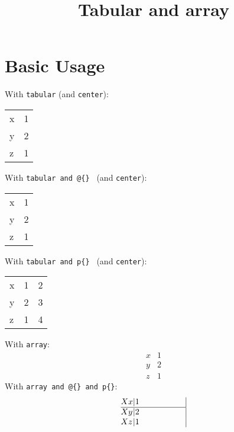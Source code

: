 \documentclass{ximera}
\title{Tabular and array}
\begin{document}
\begin{abstract}
\end{abstract}
\maketitle

\section{Basic Usage}


        With \verb|tabular| (and \verb|center|):
        \begin{center}
            \begin{tabular}{lr}
                x & 1 \\
                y & 2 \\
                z & 1
            \end{tabular}
        \end{center}
        
        With \verb|tabular and @{} | (and \verb|center|):
        \begin{center}
            \begin{tabular}{@{}l@{ }r@{.}}
             x & 1 \\
             y & 2 \\
             z & 1
            \end{tabular}
            \end{center}

    With \verb|tabular and p{} | (and \verb|center|):
        \begin{center}
            \begin{tabular}{|p{1cm}|p{2cm}|p{3cm}|}
             x & 1 & 2\\
             y & 2 & 3\\
             z & 1 & 4
            \end{tabular}
        \end{center}

    With \verb|array|:
        $$
        \begin{array}{l|r}
         x & 1 \\
         \hline
         y & 2 \\
         z & 1
        \end{array}
        $$
    With \verb|array and @{} and p{}|:
        $$
        \begin{array}{@{X }l@{|}p{2cm}|}
         x & 1 \\
         \hline
         y & 2 \\
         z & 1
        \end{array}
        $$
        
    
\end{document}
